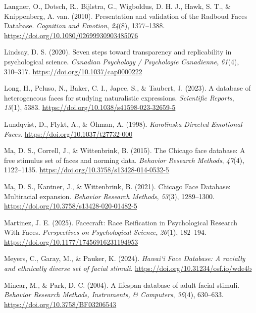 \documentclass[
  letterpaper,
  DIV=11,
  numbers=noendperiod]{scrartcl}
\newlength{\cslhangindent}
\newenvironment{CSLReferences}[2] %
 {\begin{list}{}{%
  \setlength{\itemindent}{0pt}
  \setlength{\leftmargin}{0pt}
  \setlength{\parsep}{0pt}
  \ifodd #1
   \setlength{\leftmargin}{\cslhangindent}
   \setlength{\itemindent}{-1\cslhangindent}
  \fi
  \setlength{\itemsep}{#2\baselineskip}}}
 {\end{list}}
\begin{document}
\begin{CSLReferences}{1}{0}
Langner, O., Dotsch, R., Bijlstra, G., Wigboldus, D. H. J., Hawk, S. T.,
\& Knippenberg, A. van. (2010). Presentation and validation of the
{Radboud} {Faces} {Database}. \emph{Cognition and Emotion},
\emph{24}(8), 1377--1388.
\url{https://doi.org/10.1080/02699930903485076}

Lindsay, D. S. (2020). Seven steps toward transparency and replicability
in psychological science. \emph{Canadian Psychology / Psychologie
Canadienne}, \emph{61}(4), 310--317.
\url{https://doi.org/10.1037/cap0000222}

Long, H., Peluso, N., Baker, C. I., Japee, S., \& Taubert, J. (2023). A
database of heterogeneous faces for studying naturalistic expressions.
\emph{Scientific Reports}, \emph{13}(1), 5383.
\url{https://doi.org/10.1038/s41598-023-32659-5}

Lundqvist, D., Flykt, A., \& Öhman, A. (1998). \emph{Karolinska
{Directed} {Emotional} {Faces}}.
\url{https://doi.org/10.1037/t27732-000}

Ma, D. S., Correll, J., \& Wittenbrink, B. (2015). The {Chicago} face
database: {A} free stimulus set of faces and norming data.
\emph{Behavior Research Methods}, \emph{47}(4), 1122--1135.
\url{https://doi.org/10.3758/s13428-014-0532-5}

Ma, D. S., Kantner, J., \& Wittenbrink, B. (2021). Chicago {Face}
{Database}: {Multiracial} expansion. \emph{Behavior Research Methods},
\emph{53}(3), 1289--1300.
\url{https://doi.org/10.3758/s13428-020-01482-5}

Martinez, J. E. (2025). Facecraft: {Race} {Reification} in
{Psychological} {Research} {With} {Faces}. \emph{Perspectives on
Psychological Science}, \emph{20}(1), 182--194.
\url{https://doi.org/10.1177/17456916231194953}

Meyers, C., Garay, M., \& Pauker, K. (2024). \emph{Hawai`i {Face}
{Database}: {A} racially and ethnically diverse set of facial stimuli}.
\url{https://doi.org/10.31234/osf.io/wde4b}

Minear, M., \& Park, D. C. (2004). A lifespan database of adult facial
stimuli. \emph{Behavior Research Methods, Instruments, \& Computers},
\emph{36}(4), 630--633. \url{https://doi.org/10.3758/BF03206543}


\end{CSLReferences}
\end{document}
